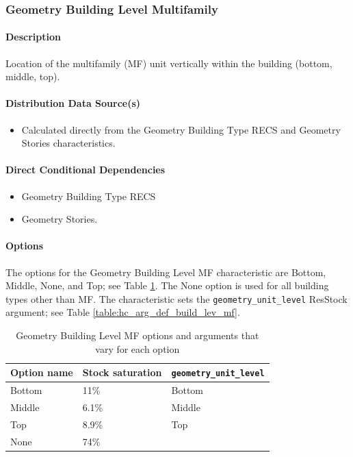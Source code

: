 \subsubsection{Geometry Building Level Multifamily}

\paragraph{Description}
Location of the multifamily (MF) unit vertically within the building (bottom, middle, top).

\paragraph{Distribution Data Source(s)}
\begin{itemize}
    \item Calculated directly from the Geometry Building Type RECS and Geometry Stories characteristics.
\end{itemize}

\paragraph{Direct Conditional Dependencies}
\begin{itemize}
    \item Geometry Building Type RECS
    \item Geometry Stories.
\end{itemize}

\paragraph{Options}
The options for the Geometry Building Level MF characteristic are Bottom, Middle, None, and Top; see Table \ref{table:hc_opt_geom_build_lev_mf}. The None option is used for all building types other than MF. The characteristic sets the \texttt{geometry\_unit\_level} ResStock argument; see Table \ref{table:hc_arg_def_build_lev_mf}.

\begin{longtable}[]{ |p{}|p{4cm}|p{4cm}| }
\caption{Geometry Building Level MF options and arguments that vary for each option} \label{table:hc_opt_geom_build_lev_mf}  \\
\toprule\noalign{}
Option name & Stock saturation & \texttt{geometry\_unit\_level} \\
\midrule\noalign{}
\endhead
\bottomrule\noalign{}
\endlastfoot
Bottom & 11\% & Bottom \\ \hline
Middle & 6.1\% & Middle \\ \hline
Top & 8.9\% & Top \\ \hline
None & 74\% & \\
\end{longtable}

